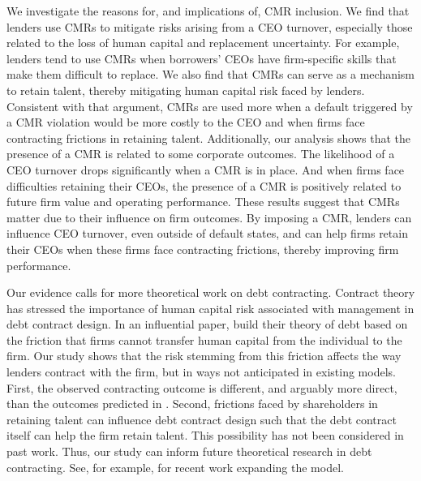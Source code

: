 \documentclass[a4paper,12pt]{article}
\begin{document}
We investigate the reasons for, and implications of, CMR inclusion.
We find that lenders use CMRs to mitigate risks arising from a CEO turnover, especially those related to the loss of human capital and replacement uncertainty.
For example, lenders tend to use CMRs when borrowers' CEOs have firm-specific skills that make them difficult to replace.
We also find that CMRs can serve as a mechanism to retain talent, thereby mitigating human capital risk faced by lenders.
Consistent with that argument, CMRs are used more when a default triggered by a CMR violation would be more costly to the CEO and when firms face contracting frictions in retaining talent. 
Additionally, our analysis shows that the presence of a CMR is related to some corporate outcomes.
The likelihood of a CEO turnover drops significantly when a CMR is in place.
And when firms face difficulties retaining their CEOs, the presence of a CMR is positively related to future firm value and operating performance.
These results suggest that CMRs matter due to their influence on firm outcomes.
By imposing a CMR, lenders can influence CEO turnover, even outside of default states, and can help firms retain their CEOs when these firms face contracting frictions, thereby improving firm performance.


Our evidence calls for more theoretical work on debt contracting.
Contract theory has stressed the importance of human capital risk associated with management in debt contract design.
In an influential paper, \cite{Hart_1994} build their theory of debt based on the friction that firms cannot transfer human capital from the individual to the firm.
Our study shows that the risk stemming from this friction affects the way lenders contract with the firm, but in ways not anticipated in existing models.
First, the observed contracting outcome is different, and arguably more direct, than the outcomes predicted in \cite{Hart_1994}.
Second, frictions faced by shareholders in retaining talent can influence debt contract design such that the debt contract itself can help the firm retain talent.
This possibility has not been considered in past work.
Thus, our study can inform future theoretical research in debt contracting.
See, for example, \cite{bolton_2019} for recent work expanding the \cite{Hart_1994} model.
\end{document}
